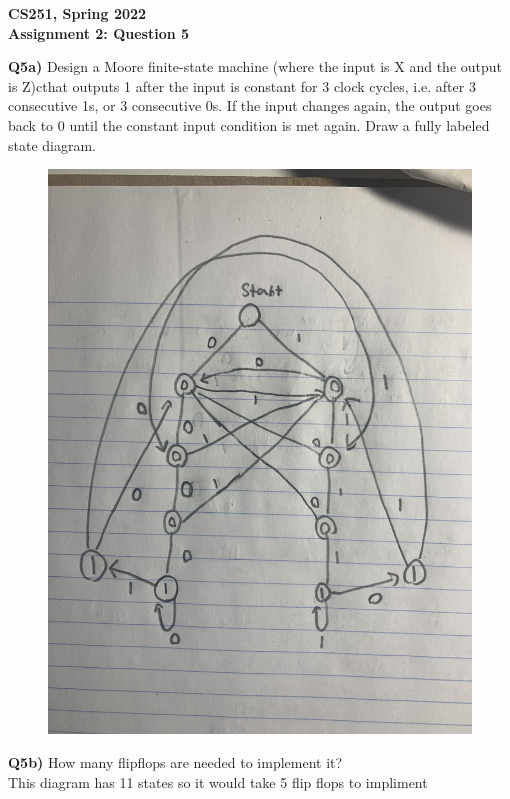 \documentclass[12pt]{article}
\begin{document}
\begin{center}
{\Large\textbf{CS251, Spring 2022}}\\
\vspace{2mm}
{\Large\textbf{Assignment 2: Question 5}}\\
\vspace{3mm}
\end{center}
\begin{adjustwidth}{0em}{0pt}
\textbf{Q5a)} Design a Moore finite-state machine (where the input is X and the output is Z)cthat outputs 1 after the input is constant for 3 clock cycles, i.e. after 3 consecutive 1s, or 3 consecutive 0s. If the input changes again, the output goes back to 0 until the constant input condition is met again. Draw a fully labeled state diagram.\\
\begin{figure}[tbhp]
	\begin{center}
		\includegraphics[width=1\textwidth, angle=270]{graph.jpg}
	\end{center}
\end{figure}

\end{adjustwidth}
\begin{adjustwidth}{0em}{0pt}
\textbf{Q5b)} How many flipflops are needed to implement it?\\

This diagram has 11 states so it would take 5 flip flops to impliment
\end{adjustwidth}
\end{document}
